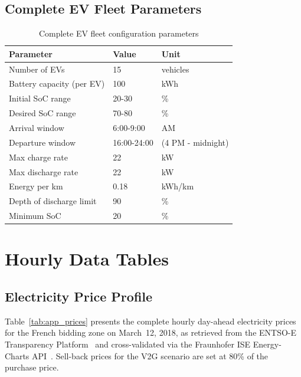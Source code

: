 \subsection{Complete EV Fleet Parameters}

\begin{table}[H]
\centering
\caption{Complete EV fleet configuration parameters}
\label{tab:app_ev_params}
\begin{tabular}{@{}lll@{}}
\toprule
\textbf{Parameter} & \textbf{Value} & \textbf{Unit} \\
\midrule
Number of EVs & 15 & vehicles \\
Battery capacity (per EV) & 100 & kWh \\
Initial SoC range & 20-30 & \% \\
Desired SoC range & 70-80 & \% \\
Arrival window & 6:00-9:00 & AM \\
Departure window & 16:00-24:00 & (4 PM - midnight) \\
Max charge rate & 22 & kW \\
Max discharge rate & 22 & kW \\
Energy per km & 0.18 & kWh/km \\
Depth of discharge limit & 90 & \% \\
Minimum SoC & 20 & \% \\
\bottomrule
\end{tabular}
\end{table}

\section{Hourly Data Tables}
\label{app:hourly_data}

\subsection{Electricity Price Profile}

Table~\ref{tab:app_prices} presents the complete hourly day-ahead electricity prices for the French bidding zone on March~12, 2018, as retrieved from the ENTSO-E Transparency Platform~\cite{entsoe_transparency} and cross-validated via the Fraunhofer ISE Energy-Charts API~\cite{energy_charts}. Sell-back prices for the V2G scenario are set at 80\% of the purchase price.

